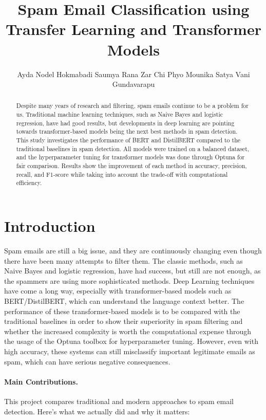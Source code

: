 \documentclass{article}
\title{Spam Email Classification using Transfer Learning and Transformer Models}
\author{%
 Ayda Nodel Hokmabadi \quad Saumya Rana \quad Zar Chi Phyo \quad Mounika Satya Vani Gundavarapu}
\begin{document}
\maketitle

\begin{abstract}
Despite many years of research and filtering, spam emails continue to be a problem for us. Traditional machine learning techniques, such as Naive Bayes and logistic regression, have had good results, but developments in deep learning are pointing towards transformer-based models being the next best methods in spam detection. This study investigates the performance of BERT and DistilBERT compared to the traditional baselines in spam detection. All models were trained on a balanced dataset, and the hyperparameter tuning for transformer models was done through Optuna for fair comparison. Results show the improvement of each method in accuracy, precision, recall, and F1-score while taking into account the trade-off with computational efficiency. 
    
\end{abstract}

\section{Introduction}
Spam emails are still a big issue, and they are continuously changing even though there have been many attempts to filter them. The classic methods, such as Naive Bayes and logistic regression, have had success, but still are not enough, as the spammers are using more sophisticated methods. Deep Learning techniques have come a long way, especially with transformer-based models such as BERT/DistilBERT, which can understand the language context better. The performance of these transformer-based models is to be compared with the traditional baselines in order to show their superiority in spam filtering and whether the increased complexity is worth the computational expense through the usage of the Optuna toolbox for hyperparameter tuning. However, even with high accuracy, these systems can still misclassify important legitimate emails as spam, which can have serious negative consequences.

\paragraph{Main Contributions.}
This project compares traditional and modern approaches to spam email detection. Here's what we actually did and why it matters:
\end{document}
